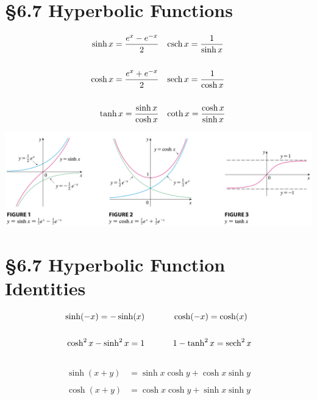 \section*{\S{6.7} Hyperbolic Functions}
\begin{equation}
\begin{split}
    \sinh x = \frac{e^x - e^{-x}}{2} \;\;\;& \operatorname{csch} x = \frac{1}{\sinh x} \\\\
    \cosh x = \frac{e^x + e^{-x}}{2} \;\;\;& \operatorname{sech} x = \frac{1}{\cosh x} \\\\
    \tanh x = \frac{\sinh x}{\cosh x} \;\;\;& \coth x = \frac{\cosh x}{\sinh x}
\end{split}
\end{equation}
\begin{center}
    \includegraphics[width=1.0\linewidth]{../images/calc-textbook/6.7/2.png}
\end{center}

\section*{\S{6.7} Hyperbolic Function Identities}
\begin{equation}
\begin{split}
    \sinh(-x) = -\sinh(x) \;\;\;\;\;\;\;\;\;\;\;\;& \cosh(-x) = \cosh(x) \\\\
    \cosh^2 x - \sinh^2 x = 1  \;\;\;\;\;\;\;\;\;\;\;\;& 1 - \tanh^2 x = \operatorname{sech}^2 x\\\\
\end{split}
\end{equation}
\begin{equation}
\begin{split}
    \sinh(x + y) &= \sinh x \cosh y + \cosh x \sinh y \\\\
    \cosh(x + y) &= \cosh x \cosh y + \sinh x \sinh y
\end{split}
\end{equation}

